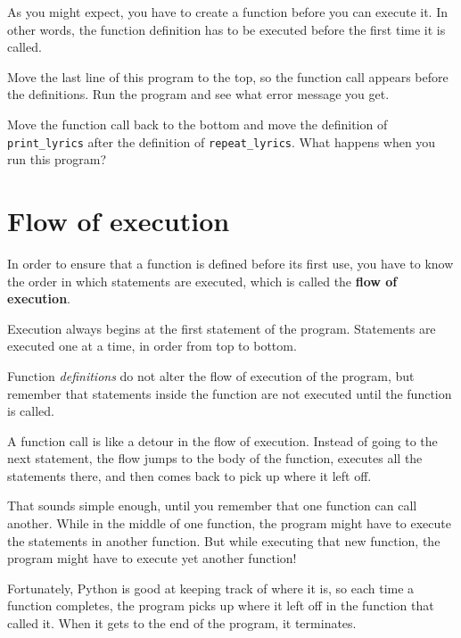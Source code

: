 
As you might expect, you have to create a function before you can
execute it.  In other words, the function definition has to be
executed before the first time it is called.

\begin{ex}
Move the last line of this program
to the top, so the function call appears before the definitions. Run 
the program and see what error
message you get.
\end{ex}

\begin{ex}
Move the function call back to the bottom
and move the definition of \verb"print_lyrics" after the definition of
\verb"repeat_lyrics".  What happens when you run this program?
\end{ex}


\section{Flow of execution}

In order to ensure that a function is defined before its first use,
you have to know the order in which statements are executed, which is
called the {\bf flow of execution}.

Execution always begins at the first statement of the program.
Statements are executed one at a time, in order from top to bottom.

Function \emph{definitions} do not alter the flow of execution of the
program, but remember that statements inside the function are not
executed until the function is called.

A function call is like a detour in the flow of execution. Instead of
going to the next statement, the flow jumps to the body of
the function, executes all the statements there, and then comes back
to pick up where it left off.

That sounds simple enough, until you remember that one function can
call another.  While in the middle of one function, the program might
have to execute the statements in another function. But while
executing that new function, the program might have to execute yet
another function!

Fortunately, Python is good at keeping track of where it is, so each
time a function completes, the program picks up where it left off in
the function that called it.  When it gets to the end of the program,
it terminates.

